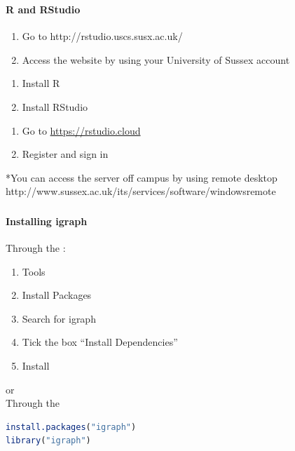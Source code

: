 \documentclass[8pt]{beamer}
\begin{document}
\begin{frame}
\frametitle{\insertsection}
\framesubtitle{R and RStudio}


{\color{blue}{On campus*}}
\begin{enumerate}
	\item Go to http://rstudio.uscs.susx.ac.uk/
	\item Access the website by using your University of Sussex account
\end{enumerate}

\medskip

{\color{blue}{On your personal computer}}
\begin{enumerate}
	\item Install R
	\item Install RStudio
\end{enumerate}

\medskip

{\color{blue}{RStudio cloud}}
\begin{enumerate}
	\item Go to \url{https://rstudio.cloud}
	\item Register and sign in
\end{enumerate}

\medskip
\medskip

*You can access the server off campus by using remote desktop
http://www.sussex.ac.uk/its/services/software/windowsremote

\end{frame}


\begin{frame}[fragile]
\frametitle{\insertsection}
\framesubtitle{Installing igraph}

Through the {\color{blue}{RStudio interface}}:\\
\begin{enumerate}
	\item Tools
	\item Install Packages
	\item Search for igraph
	\item Tick the box ``Install Dependencies''
	\item Install
\end{enumerate}
\medskip
\medskip
or\\
\medskip
\medskip
Through the {\color{blue}{RStudio console}}

\begin{lstlisting}[language=R]
install.packages("igraph")
library("igraph")
\end{lstlisting}

\end{frame}
\end{document}
